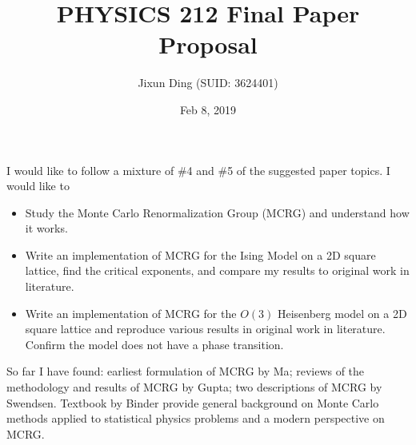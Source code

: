 \documentclass{article}
\title{PHYSICS 212 Final Paper Proposal}
\author{Jixun Ding (SUID: 3624401)}
\date{Feb 8, 2019}
\begin{document}
\maketitle

I would like to follow a mixture of  \#4 and \#5 of the suggested paper topics. I would like to
\begin{itemize}
\item Study the Monte Carlo Renormalization Group (MCRG) and understand how it works.

\item Write an implementation of MCRG for the Ising Model on a 2D square lattice, find the critical exponents, and compare my results to original work in literature\cite{Swendsen1979}.

\item  Write an implementation of MCRG for the $O(3)$ Heisenberg model on a 2D square lattice and reproduce various results in original work in literature\cite{Shenker1980}. Confirm the model does not have a phase transition.

\end{itemize}

So far I have found: earliest formulation of MCRG by Ma\cite{Ma1976}; reviews of the methodology and results of MCRG by Gupta\cite{Gupta1986,Gupta1987}; two descriptions of MCRG by Swendsen\cite{Swendsen1982,Swendsen1984}. Textbook by Binder\cite{Binder2014} provide general background on Monte Carlo methods applied to statistical physics problems and a modern perspective on MCRG.



\end{document}
